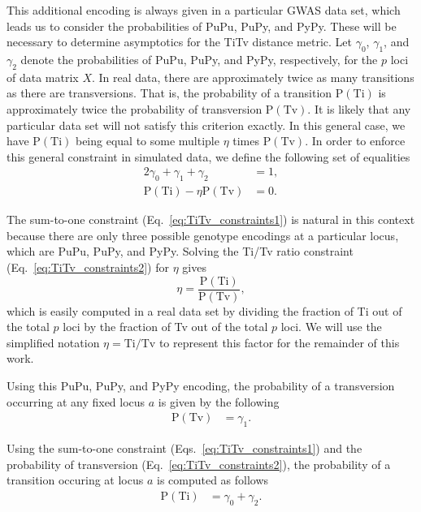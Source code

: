 \documentclass[10pt,letterpaper]{article}
\begin{document}
\bigskip

This additional encoding is always given in a particular GWAS data set, which leads us to consider the probabilities of PuPu, PuPy, and PyPy. These will be necessary to determine asymptotics for the TiTv distance metric. Let $\gamma_0$, $\gamma_1$, and $\gamma_2$ denote the probabilities of PuPu, PuPy, and PyPy, respectively, for the $p$ loci of data matrix $X$. In real data, there are approximately twice as many transitions as there are transversions. That is, the probability of a transition $\text{P}(\text{Ti})$ is approximately twice the probability of transversion $\text{P}(\text{Tv})$. It is likely that any particular data set will not satisfy this criterion exactly. In this general case, we have $\text{P}(\text{Ti})$ being equal to some multiple $\eta$ times $\text{P}(\text{Tv})$. In order to enforce this general constraint in simulated data, we define the following set of equalities
%
\begin{alignat}{2}\label{eq:TiTv_constraints1}
\gamma_0 + \gamma_1 + \gamma_2 &= 1, \\ \label{eq:TiTv_constraints2}
\text{P}(\text{Ti}) - \eta \text{P}(\text{Tv}) &= 0.
\end{alignat}

The sum-to-one constraint (Eq.~\ref{eq:TiTv_constraints1}) is natural in this context because there are only three possible genotype encodings at a particular locus, which are PuPu, PuPy, and PyPy. Solving the Ti/Tv ratio constraint (Eq.~\ref{eq:TiTv_constraints2}) for $\eta$ gives
%
\[
\eta = \frac{\text{P}(\text{Ti})}{\text{P}(\text{Tv})},
\]
%
which is easily computed in a real data set by dividing the fraction of Ti out of the total $p$ loci by the fraction of Tv out of the total $p$ loci. We will use the simplified notation $\eta=\text{Ti}/\text{Tv}$ to represent this factor for the remainder of this work.

Using this PuPu, PuPy, and PyPy encoding, the probability of a transversion occurring at any fixed locus $a$ is given by the following
%
\begin{equation}\label{eq:prob_Tv}
\begin{aligned}
\text{P}(\text{Tv}) &= \gamma_1.
\end{aligned}
\end{equation}

Using the sum-to-one constraint (Eqs.~\ref{eq:TiTv_constraints1}) and the probability of transversion (Eq.~\ref{eq:TiTv_constraints2}), the probability of a transition occuring at locus $a$ is computed as follows
%
\begin{equation}\label{eq:prob_Ti}
\begin{aligned}
\text{P}(\text{Ti}) &= \gamma_0 + \gamma_2.
\end{aligned}
\end{equation}
\end{document}
